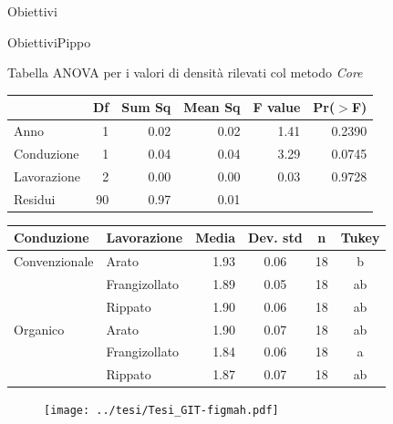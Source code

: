 \documentclass[10pt]{beamer}
\begin{document}
\begin{frame}{Obiettivi}
\begin{frame}{Obiettivi}{Pippo}
\begin{frame}{Tabella ANOVA per i valori di densità rilevati col metodo \emph{Core}} 
  \begin{table}[ht]
    \centering
    \label{tab:anova del modello}
    \begin{tabular}{lrrrrr}
      \hline
      & Df & Sum Sq & Mean Sq & F value & Pr($>$F) \\ 
      \hline
      Anno & 1 & 0.02 & 0.02 & 1.41 & 0.2390 \\ 
      Conduzione & 1 & 0.04 & 0.04 & 3.29 & 0.0745 \\ 
      Lavorazione & 2 & 0.00 & 0.00 & 0.03 & 0.9728 \\ 
      Residui & 90 & 0.97 & 0.01 &  &  \\ 
      \hline
    \end{tabular}
  \end{table}
\end{frame}


\begin{frame}[label=Clod]
  \hyperlink{densita}{}
  \footnotesize
  \begin{table}[ht]
    \centering
    \begin{tabular}{llrccc}
      \hline
      Conduzione & Lavorazione & Media & Dev. std & n & Tukey \\ 
      \hline
      Convenzionale & Arato & 1.93 & 0.06 &  18 & b \\ 
                 & Frangizollato & 1.89 & 0.05 &  18 & ab \\ 
                 & Rippato & 1.90 & 0.06 &  18 & ab \\ 
      Organico & Arato & 1.90 & 0.07 &  18 & ab \\ 
                 & Frangizollato & 1.84 & 0.06 &  18 & a \\ 
                 & Rippato & 1.87 & 0.07 &  18 & ab \\ 
      \hline
    \end{tabular}
    \label{tab:RiassuntoDensitaSpinta}
  \end{table}
\end{frame}

\begin{frame}
  \vspace{1.5cm}
  \begin{figure}
    \texttt{[image: ../tesi/Tesi\_GIT-figmah.pdf]}
  \end{figure}
\end{frame}



\end{frame}
\end{frame}
\end{document}
